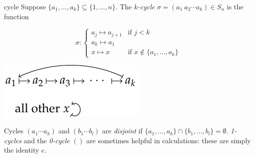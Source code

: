 \begin{defn}{}{cycle}
Suppose $\{a_1,\ldots,a_k\}\subseteq\{1,\ldots,n\}$. The \emph{$k$-cycle} $\sigma=(a_1\ a_2\cdots a_k)\in S_n$ is the function\par
\begin{minipage}[t]{0.5\linewidth}\vspace{-12pt}
\[
\sigma:\begin{cases}
a_j\mapsto a_{j+1}&\text{if $j<k$}\\
a_k\mapsto a_1\\
x\mapsto x&\text{if }x\not\in\{a_1,\ldots,a_k\}
\end{cases}
\]
\end{minipage}\begin{minipage}[t]{0.5\linewidth}\vspace{2pt}
\includegraphics[scale=0.9]{perm-cycle4}
\end{minipage}\bigbreak
Cycles $(a_1\cdots a_k)$ and $(b_1\cdots b_l)$ are \emph{disjoint} if $\{a_1,\ldots,a_k\}\cap\{b_1,\ldots,b_l\}=\emptyset$.\smallbreak
\emph{1-cycles} and the \emph{0-cycle} $()$ are sometimes helpful in calculations: these are simply the identity $e$.
\end{defn}


